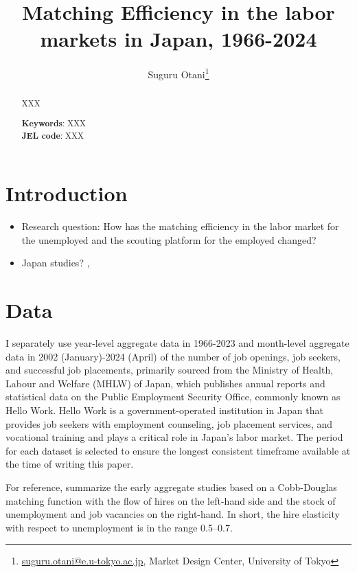 \documentclass[12pt]{article}
\begin{document}
\title{Matching Efficiency in the labor markets in Japan, 1966-2024}
\author{Suguru Otani\thanks{\href{mailto:}{suguru.otani@e.u-tokyo.ac.jp}, Market Design Center, University of Tokyo}}
\maketitle

\begin{abstract}
\noindent
XXX

\textbf{Keywords}: XXX \\
\textbf{JEL code}: XXX
\end{abstract}

\section{Introduction}

\begin{itemize}
    \item Research question: How has the matching efficiency in the labor market for the unemployed and the scouting platform for the employed changed?
\end{itemize}

\begin{itemize}
    \item Japan studies? \cite{kawata2021first}, \cite{fukai2021describing}
\end{itemize}

\section{Data}

I separately use year-level aggregate data in 1966-2023 and month-level aggregate data in 2002 (January)-2024 (April) of the number of job openings, job seekers, and successful job placements, primarily sourced from the Ministry of Health, Labour and Welfare (MHLW) of Japan, which publishes annual reports and statistical data on the Public Employment Security Office, commonly known as Hello Work. 
Hello Work is a government-operated institution in Japan that provides job seekers with employment counseling, job placement services, and vocational training and plays a critical role in Japan's labor market.
The period for each dataset is selected to ensure the longest consistent timeframe available at the time of writing this paper.

For reference, \cite{petrongolo2001looking} summarize the early aggregate studies based on a Cobb-Douglas matching function with the flow of hires on the left-hand side and the stock of unemployment and job vacancies on the right-hand. 
In short, the hire elasticity with respect to unemployment is in the range 0.5–0.7.
\end{document}

